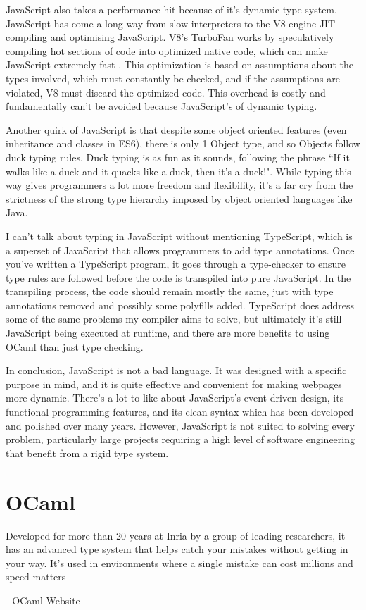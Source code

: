 \documentclass[12pt,a4paper,twoside,openright]{report}
\begin{document}
JavaScript also takes a performance hit because of it's dynamic type system.
JavaScript has come a long way from slow interpreters to the V8 engine JIT compiling and optimising JavaScript.
V8's TurboFan works by speculatively compiling hot sections of code into optimized native code, which can make JavaScript extremely fast \cite{v8-jit}.
This optimization is based on assumptions about the types involved, which must constantly be checked, and if the assumptions are violated, V8 must discard the optimized code.
This overhead is costly and fundamentally can't be avoided because JavaScript's of dynamic typing.

Another quirk of JavaScript is that despite some object oriented features (even inheritance and classes in ES6), there is only 1 Object type, and so Objects follow duck typing rules.
Duck typing is as fun as it sounds, following the phrase ``If it walks like a duck and it quacks like a duck, then it's a duck!".
While typing this way gives programmers a lot more freedom and flexibility, it's a far cry from the strictness of the strong type hierarchy imposed by object oriented languages like Java.

I can't talk about typing in JavaScript without mentioning TypeScript, which is a superset of JavaScript that allows programmers to add type annotations.
Once you've written a TypeScript program, it goes through a type-checker to ensure type rules are followed before the code is transpiled into pure JavaScript.
In the transpiling process, the code should remain mostly the same, just with type annotations removed and possibly some polyfills added.
TypeScript does address some of the same problems my compiler aims to solve, but ultimately it's still JavaScript being executed at runtime, and there are more benefits to using OCaml than just type checking.

In conclusion, JavaScript is not a bad language.
It was designed with a specific purpose in mind, and it is quite effective and convenient for making webpages more dynamic.
There's a lot to like about JavaScript's event driven design, its functional programming features, and its clean syntax which has been developed and polished over many years.
However, JavaScript is not suited to solving every problem, particularly large projects requiring a high level of software engineering that benefit from a rigid type system.

\section{OCaml}
\epigraph{Developed for more than 20 years at Inria by a group of leading researchers, it has an advanced type system that helps catch your mistakes without getting in your way. It's used in environments where a single mistake can cost millions and speed matters \cite{ocamlorg}}{- OCaml Website}
\end{document}

